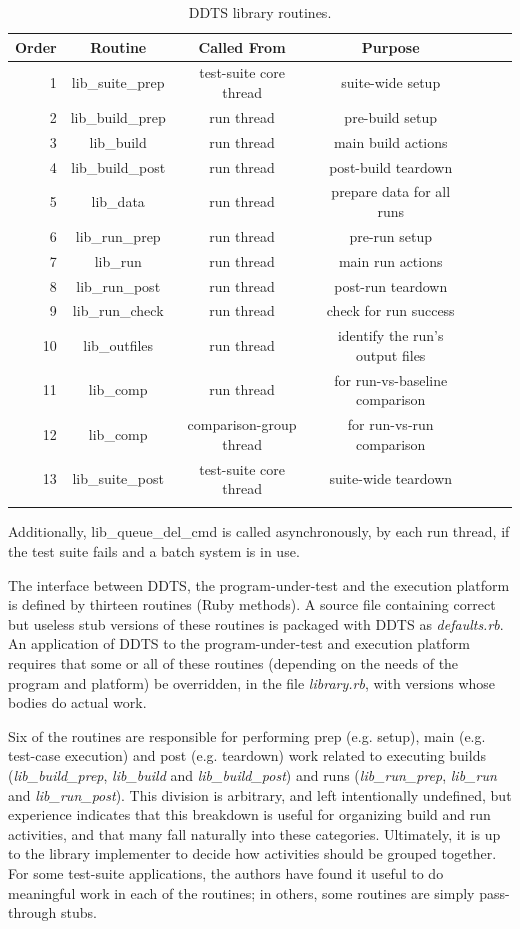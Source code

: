 \documentclass[conference]{IEEEtran}
\begin{document}
\begin{table}[!t]
\centering
\begin{tabular}{r c c c c c c}
\hline
Order & Routine & Called From & Purpose \\ 
\hline
1 & lib\_suite\_prep & test-suite core thread & suite-wide setup \\
2 & lib\_build\_prep & run thread & pre-build setup \\
3 & lib\_build & run thread & main build actions \\
4 & lib\_build\_post & run thread & post-build teardown \\
5 & lib\_data & run thread & prepare data for all runs \\
6 & lib\_run\_prep & run thread & pre-run setup \\
7 & lib\_run & run thread & main run actions \\
8 & lib\_run\_post & run thread & post-run teardown \\
9 & lib\_run\_check & run thread & check for run success \\
10 & lib\_outfiles & run thread & identify the run's output files \\
11 & lib\_comp & run thread & for run-vs-baseline comparison \\
12 & lib\_comp & comparison-group thread & for run-vs-run comparison \\
13 & lib\_suite\_post & test-suite core thread & suite-wide teardown \\
\hline
\newline
\end{tabular}
Additionally, lib\_queue\_del\_cmd is called asynchronously, by each run thread, if the test suite fails and a batch system is in use.
\newline
\caption{DDTS library routines. }
\label{table:routines}
\end{table}

The interface between DDTS, the program-under-test and the execution platform is defined by thirteen routines (Ruby methods). A source file containing correct but useless stub versions of these routines is packaged with DDTS as \emph{defaults.rb}. An application of DDTS to the program-under-test and execution platform requires that some or all of these routines (depending on the needs of the program and platform) be overridden, in the file \emph{library.rb}, with versions whose bodies do actual work.

Six of the routines are responsible for performing prep (e.g. setup), main (e.g. test-case execution) and post (e.g. teardown) work related to executing builds (\emph{lib\_build\_prep}, \emph{lib\_build} and \emph{lib\_build\_post}) and runs (\emph{lib\_run\_prep}, \emph{lib\_run} and \emph{lib\_run\_post}). This division is arbitrary, and left intentionally undefined, but experience indicates that this breakdown is useful for organizing build and run activities, and that many fall naturally into these categories. Ultimately, it is up to the library implementer to decide how activities should be grouped together. For some test-suite applications, the authors have found it useful to do meaningful work in each of the routines; in others, some routines are simply pass-through stubs.
\end{document}

